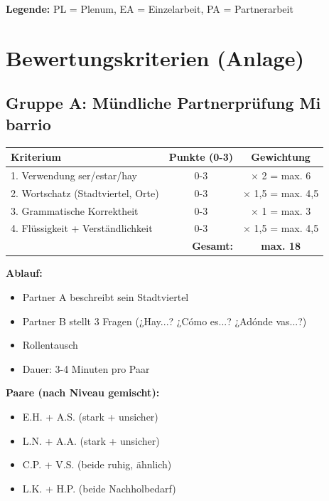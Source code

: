 \documentclass[11pt, a4paper]{article}
\begin{document}
\textbf{Legende:} PL = Plenum, EA = Einzelarbeit, PA = Partnerarbeit


\section{Bewertungskriterien (Anlage)}

\subsection{Gruppe A: Mündliche Partnerprüfung \glqq{}Mi barrio\grqq{}}

\begin{center}
\begin{tabular}{|p{4.5cm}|c|c|}
    \hline
    \textbf{Kriterium} & \textbf{Punkte (0-3)} & \textbf{Gewichtung} \\
    \hline
    1. Verwendung ser/estar/hay & 0-3 & $\times$ 2 = max. 6 \\
    \hline
    2. Wortschatz (Stadtviertel, Orte) & 0-3 & $\times$ 1,5 = max. 4,5 \\
    \hline
    3. Grammatische Korrektheit & 0-3 & $\times$ 1 = max. 3 \\
    \hline
    4. Flüssigkeit + Verständlichkeit & 0-3 & $\times$ 1,5 = max. 4,5 \\
    \hline
    \multicolumn{2}{|r|}{\textbf{Gesamt:}} & \textbf{max. 18} \\
    \hline
\end{tabular}
\end{center}

\textbf{Ablauf:}
\begin{itemize}[leftmargin=2em]
    \item Partner A beschreibt sein Stadtviertel
    \item Partner B stellt 3 Fragen (¿Hay...? ¿Cómo es...? ¿Adónde vas...?)
    \item Rollentausch
    \item Dauer: 3-4 Minuten pro Paar
\end{itemize}

\textbf{Paare (nach Niveau gemischt):}
\begin{itemize}[leftmargin=2em]
    \item E.H. + A.S. (stark + unsicher)
    \item L.N. + A.A. (stark + unsicher)
    \item C.P. + V.S. (beide ruhig, ähnlich)
    \item L.K. + H.P. (beide Nachholbedarf)
\end{itemize}
\end{document}
